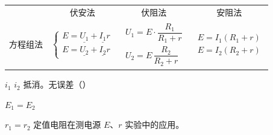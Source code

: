 \begin{center}
\renewcommand{\arraystretch}{1.6}
\begin{tabular}{@{}c c c c@{}}
 & 伏安法 & 伏阻法 & 安阻法\\
方程组法 &
$\left\{\begin{array}{l} E=\underline{U_1}+\underline{I_1}r\\ E=\underline{U_2}+\underline{I_2}r\end{array}\right.$ &
$\begin{array}{l} U_1=E\cdot\dfrac{R_1}{R_1+r}\\[6pt] U_2=E\,\dfrac{R_2}{R_2+r}\end{array}$ &
$\begin{array}{l} E=I_1(R_1+r)\\ E=I_2(R_2+r)\end{array}$
\end{tabular}
\end{center}

$i_1$ $i_2$ 抵消。无误差（）

$E_1=E_2$

$r_1=r_2$
定值电阻在测电源 $E$、$r$ 实验中的应用。


